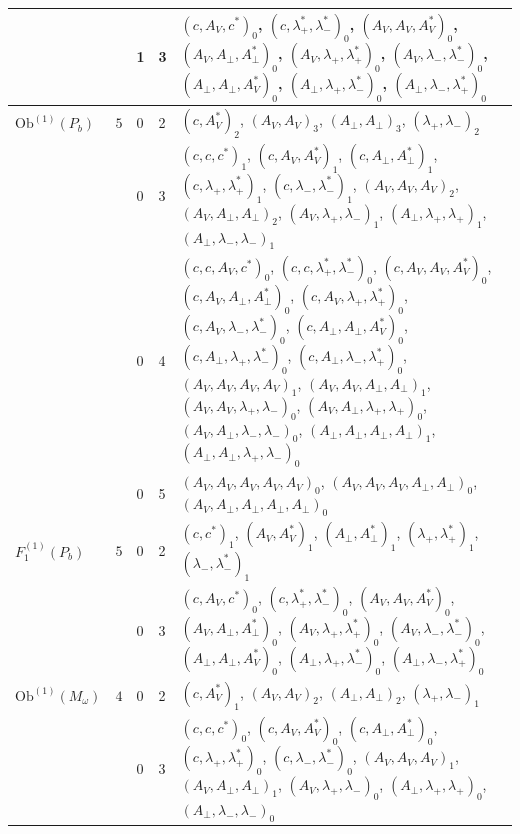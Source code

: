 \documentclass[11pt]{article}
\numberwithin{equation}{section}
\theoremstyle{plain}
\theoremstyle{definition}
\newcommand{\Ob}{\mathrm{Ob}}
\begin{document}
{\begin{longtable}{>{\raggedright}p{2.3cm}|p{0.6cm}|p{0.25cm}|p{0.25cm}|>{\raggedright\arraybackslash}p{11.6cm}}
 &  & 1 & 3 & $(c,A_V,c^*)_{0}$, $(c,\lambda^*_+,\lambda^*_-)_{0}$, $(A_V,A_V,A^*_V)_{0}$, $(A_V,A_\perp,A^*_\perp)_{0}$, $(A_V,\lambda_+,\lambda^*_+)_{0}$, $(A_V,\lambda_-,\lambda^*_-)_{0}$, $(A_\perp,A_\perp,A^*_V)_{0}$, $(A_\perp,\lambda_+,\lambda^*_-)_{0}$, $(A_\perp,\lambda_-,\lambda^*_+)_{0}$ \\
\hline
$\Ob^{(1)}(P_b)$ & $5$ & 0 & 2 & $(c,A^*_V)_{2}$, $(A_V,A_V)_{3}$, $(A_\perp,A_\perp)_{3}$, $(\lambda_+,\lambda_-)_{2}$ \\
 &  & 0 & 3 & $(c,c,c^*)_{1}$, $(c,A_V,A^*_V)_{1}$, $(c,A_\perp,A^*_\perp)_{1}$, $(c,\lambda_+,\lambda^*_+)_{1}$, $(c,\lambda_-,\lambda^*_-)_{1}$, $(A_V,A_V,A_V)_{2}$, $(A_V,A_\perp,A_\perp)_{2}$, $(A_V,\lambda_+,\lambda_-)_{1}$, $(A_\perp,\lambda_+,\lambda_+)_{1}$, $(A_\perp,\lambda_-,\lambda_-)_{1}$ \\
 &  & 0 & 4 & $(c,c,A_V,c^*)_{0}$, $(c,c,\lambda^*_+,\lambda^*_-)_{0}$, $(c,A_V,A_V,A^*_V)_{0}$, $(c,A_V,A_\perp,A^*_\perp)_{0}$, $(c,A_V,\lambda_+,\lambda^*_+)_{0}$, $(c,A_V,\lambda_-,\lambda^*_-)_{0}$, $(c,A_\perp,A_\perp,A^*_V)_{0}$, $(c,A_\perp,\lambda_+,\lambda^*_-)_{0}$, $(c,A_\perp,\lambda_-,\lambda^*_+)_{0}$, $(A_V,A_V,A_V,A_V)_{1}$, $(A_V,A_V,A_\perp,A_\perp)_{1}$, $(A_V,A_V,\lambda_+,\lambda_-)_{0}$, $(A_V,A_\perp,\lambda_+,\lambda_+)_{0}$, $(A_V,A_\perp,\lambda_-,\lambda_-)_{0}$, $(A_\perp,A_\perp,A_\perp,A_\perp)_{1}$, $(A_\perp,A_\perp,\lambda_+,\lambda_-)_{0}$ \\
 &  & 0 & 5 & $(A_V,A_V,A_V,A_V,A_V)_{0}$, $(A_V,A_V,A_V,A_\perp,A_\perp)_{0}$, $(A_V,A_\perp,A_\perp,A_\perp,A_\perp)_{0}$ \\
\hline
$F_1^{(1)}(P_b)$ & $5$ & 0 & 2 & $(c,c^*)_{1}$, $(A_V,A^*_V)_{1}$, $(A_\perp,A^*_\perp)_{1}$, $(\lambda_+,\lambda^*_+)_{1}$, $(\lambda_-,\lambda^*_-)_{1}$ \\
 &  & 0 & 3 & $(c,A_V,c^*)_{0}$, $(c,\lambda^*_+,\lambda^*_-)_{0}$, $(A_V,A_V,A^*_V)_{0}$, $(A_V,A_\perp,A^*_\perp)_{0}$, $(A_V,\lambda_+,\lambda^*_+)_{0}$, $(A_V,\lambda_-,\lambda^*_-)_{0}$, $(A_\perp,A_\perp,A^*_V)_{0}$, $(A_\perp,\lambda_+,\lambda^*_-)_{0}$, $(A_\perp,\lambda_-,\lambda^*_+)_{0}$ \\
\hline
$\Ob^{(1)}(M_\omega)$ & $4$ & 0 & 2 & $(c,A^*_V)_{1}$, $(A_V,A_V)_{2}$, $(A_\perp,A_\perp)_{2}$, $(\lambda_+,\lambda_-)_{1}$ \\
 &  & 0 & 3 & $(c,c,c^*)_{0}$, $(c,A_V,A^*_V)_{0}$, $(c,A_\perp,A^*_\perp)_{0}$, $(c,\lambda_+,\lambda^*_+)_{0}$, $(c,\lambda_-,\lambda^*_-)_{0}$, $(A_V,A_V,A_V)_{1}$, $(A_V,A_\perp,A_\perp)_{1}$, $(A_V,\lambda_+,\lambda_-)_{0}$, $(A_\perp,\lambda_+,\lambda_+)_{0}$, $(A_\perp,\lambda_-,\lambda_-)_{0}$ \\

\end{longtable}}
\end{document}

